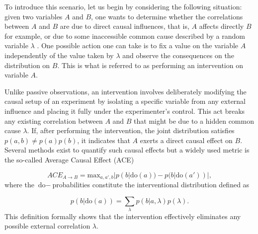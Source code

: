 \documentclass[aps,pra,reprint, superscriptaddress,showkeys]{revtex4-2}
\theoremstyle{plain}
\begin{document}
To introduce this scenario, let us begin by considering the following situation: given two variables \( A \) and \( B \), one wants to determine whether the correlations between $A$ and $B$ are due to direct causal influences, that is, \( A \) affects directly \( B \) for example, or due to some inaccessible common cause described by a random variable \( \lambda \) \cite{chen2002maximal}. One possible action one can take is to fix a value on the variable \( A \) independently of the value taken by \( \lambda \)  and observe the consequences on the distribution on $B$. This is what is referred to as performing an intervention on variable \( A \).

Unlike passive observations, an intervention involves deliberately modifying the causal setup of an experiment by isolating a specific variable from any external influence and placing it fully under the experimenter’s control. This act breaks any existing correlation between $A$ and $B$ that might be due to a hidden common cause $\lambda$. If, after performing the intervention, the joint distribution satisfies $p(a,b) \neq p(a)p(b)$, it indicates that $A$ exerts a direct causal effect on $B$. Several methods exist to quantify such causal effects but a widely used metric is the so-called Average Causal Effect (ACE) \cite{Instrumental_Miklin} 

\begin{equation}
    ACE_{A\rightarrow B}= \text{max}_{a,a',b} |p(b|\text{do}(a)) -  p(b|\text{do}(a'))|,\label{eq: ACE}
\end{equation}
where the $\text{do}-$probabilities constitute the interventional distribution defined as 

\begin{equation}
p(b|\mathrm{do}(a)) = \sum_{\lambda} p(b|a, \lambda)p(\lambda).
\end{equation}
This definition formally shows that the intervention effectively eliminates any possible external correlation $\lambda$. 
\end{document}
